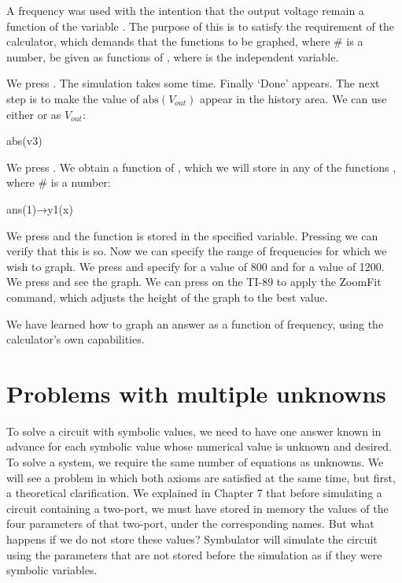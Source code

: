 A frequency  was used with the intention that the output
voltage remain a function of the variable . The purpose of
this is to satisfy the requirement of the calculator, which demands
that the functions  to be graphed, where \# is a number,
be given as functions of , where  is the independent
variable.

We press . The simulation takes some time. Finally `Done'
appears. The next step is to make the value of
$\mathrm{abs}(V_{out})$ appear in the history area. We can use
either  or  as $V_{out}$:

\begin{entry}
abs(v3)
\end{entry}

We press . We obtain a function of , which we
will store in any of the functions , where \# is a
number:

\begin{entry}
ans(1)→y1(x)
\end{entry}

We press  and the function is stored in the specified
variable. Pressing \key{$\diamond$}  we can verify that this
is so. Now we can specify the range of frequencies for which we wish
to graph. We press \key{$\diamond$}  and specify for
 a value of 800 and for  a value of 1200. We
press \key{$\diamond$}  and see the graph. We can press
  on the TI-89 to apply the ZoomFit command, which
adjusts the height of the graph to the best value.

We have learned how to graph an answer as a function of frequency,
using the calculator's own capabilities.

\section{Problems with multiple unknowns}

To solve a circuit with symbolic values, we need to have one answer
known in advance for each symbolic value whose numerical value is
unknown and desired. To solve a system, we require the same number
of equations as unknowns. We will see a problem in which both axioms
are satisfied at the same time, but first, a theoretical
clarification. We explained in Chapter 7 that before simulating a
circuit containing a two-port, we must have stored in memory the
values of the four parameters of that two-port, under the
corresponding names. But what happens if we do not store these
values? Symbulator will simulate the circuit using the parameters
that are not stored before the simulation as if they were symbolic
variables.

